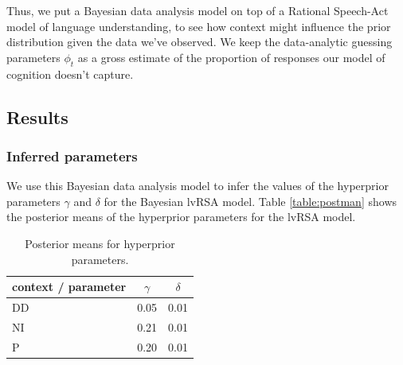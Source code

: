 \documentclass[10pt,letterpaper]{article}
\begin{document}
Thus, we put a Bayesian data analysis model on top of a Rational Speech-Act model of language understanding, to see how context might influence the prior distribution given the data we've observed. We keep the data-analytic guessing parameters $\phi_{t}$ as a gross estimate of the proportion of responses our model of cognition doesn't capture. 
%	
%			
%			
%	
%				
%				


\subsection{Results}

\subsubsection{Inferred parameters}
We use this Bayesian data analysis model to infer the values of the hyperprior parameters $\gamma$ and $\delta$ for the Bayesian lvRSA model. Table \ref{table:postman} shows the posterior means of the hyperprior parameters for the lvRSA model.

\begin{table}[h]
\begin{tabular}{l | c | c}
context / parameter & $\gamma$ & $\delta$ \\
\hline
DD                  & 0.05  & 0.01  \\
NI                  & 0.21  & 0.01  \\
P                   & 0.20  & 0.01 
\end{tabular}
\caption{Posterior means for hyperprior parameters.}
\label{table:postmeans}
\end{table}
\end{document}
